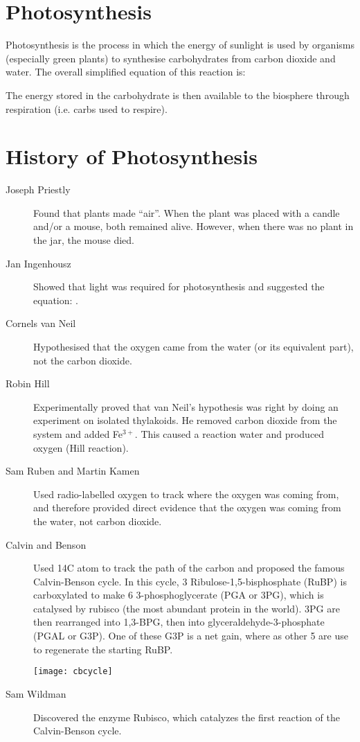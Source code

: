 \section{Photosynthesis}

Photosynthesis is the process in which the energy of sunlight is used by organisms (especially green plants) to synthesise carbohydrates from carbon dioxide and water.
The overall simplified equation of this reaction is:

The energy stored in the carbohydrate is then available to the biosphere through respiration (i.e. carbs used to respire).

\section{History of Photosynthesis}
\begin{description}
\item[Joseph Priestly] Found that plants made ``air''.
When the plant was placed with a candle and/or a mouse, both remained alive.
However, when there was no plant in the jar, the mouse died.
\item[Jan Ingenhousz] Showed that light was required for photosynthesis and suggested the equation: .
\item[Cornels van Neil] Hypothesised that the oxygen came from the water (or its equivalent part), not the carbon dioxide.
\item[Robin Hill] Experimentally proved that van Neil's hypothesis was right by doing an experiment on isolated thylakoids.
He removed carbon dioxide from the system and added Fe$^{3+}$.
This caused a reaction water and produced oxygen (Hill reaction).
\item[Sam Ruben and Martin Kamen] Used radio-labelled oxygen to track where the oxygen was coming from, and therefore provided direct evidence that the oxygen was coming from the water, not carbon dioxide.
\item[Calvin and Benson] Used 14C atom to track the path of the carbon and proposed the famous Calvin-Benson cycle.
In this cycle, 3 Ribulose-1,5-bisphosphate (RuBP) is carboxylated to make 6 3-phosphoglycerate (PGA or 3PG), which is catalysed by rubisco (the most abundant protein in the world).
3PG are then rearranged into 1,3-BPG, then into glyceraldehyde-3-phosphate (PGAL or G3P).
One of these G3P is a net gain, where as other 5 are use to regenerate the starting RuBP.

\begin{center}
\texttt{[image: cbcycle]}
\end{center}

\item[Sam Wildman] Discovered the enzyme Rubisco, which catalyzes the first reaction of the Calvin-Benson cycle.
\end{description}

